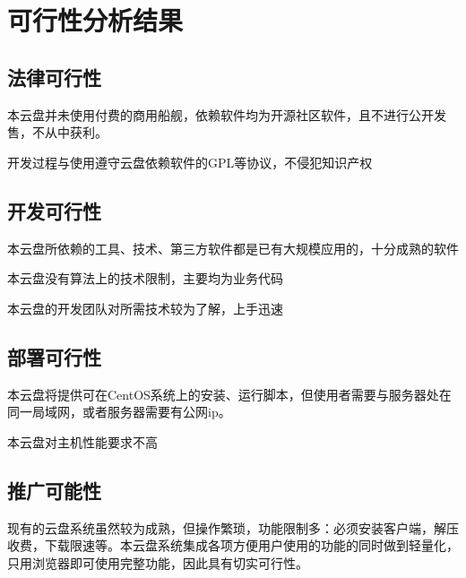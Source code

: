 \chapter{可行性分析结果}

\section{法律可行性}

本云盘并未使用付费的商用船舰，依赖软件均为开源社区软件，且不进行公开发售，不从中获利。

开发过程与使用遵守云盘依赖软件的GPL等协议，不侵犯知识产权

\section{开发可行性}

本云盘所依赖的工具、技术、第三方软件都是已有大规模应用的，十分成熟的软件

本云盘没有算法上的技术限制，主要均为业务代码

本云盘的开发团队对所需技术较为了解，上手迅速

\section{部署可行性}

本云盘将提供可在CentOS系统上的安装、运行脚本，但使用者需要与服务器处在同一局域网，或者服务器需要有公网ip。

本云盘对主机性能要求不高

\section{推广可能性}

现有的云盘系统虽然较为成熟，但操作繁琐，功能限制多：必须安装客户端，解压收费，下载限速等。本云盘系统集成各项方便用户使用的功能的同时做到轻量化，只用浏览器即可使用完整功能，因此具有切实可行性。
